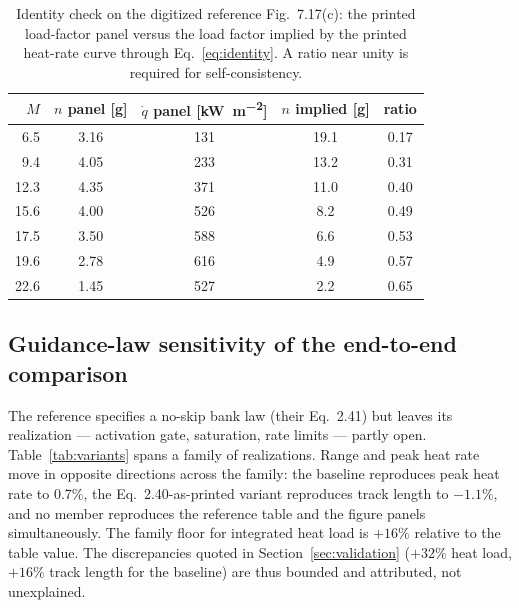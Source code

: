 \begin{table}[htbp]
\centering
\caption{Identity check on the digitized reference Fig.~7.17(c): the
  printed load-factor panel versus the load factor implied by the printed
  heat-rate curve through Eq.~\eqref{eq:identity}. A ratio near unity is
  required for self-consistency.}
\label{tab:identity}
\begin{tabular}{rcccc}
\toprule
$M$ & $n$ panel [g] & $\dot{q}$ panel [\si{\kilo\watt\per\square\metre}] &
$n$ implied [g] & ratio \\
\midrule
6.5   & 3.16 & 131 & 19.1 & 0.17 \\
9.4   & 4.05 & 233 & 13.2 & 0.31 \\
12.3  & 4.35 & 371 & 11.0 & 0.40 \\
15.6  & 4.00 & 526 & 8.2  & 0.49 \\
17.5  & 3.50 & 588 & 6.6  & 0.53 \\
19.6  & 2.78 & 616 & 4.9  & 0.57 \\
22.6  & 1.45 & 527 & 2.2  & 0.65 \\
\bottomrule
\end{tabular}
\end{table}

\subsection{Guidance-law sensitivity of the end-to-end comparison}
\label{app:variants}

The reference specifies a no-skip bank law (their Eq.~2.41) but leaves its
realization --- activation gate, saturation, rate limits --- partly open.
Table~\ref{tab:variants} spans a family of realizations. Range and peak
heat rate move in opposite directions across the family: the baseline
reproduces peak heat rate to 0.7\%, the Eq.~2.40-as-printed variant
reproduces track length to $-1.1\%$, and no member reproduces the
reference table and the figure panels simultaneously. The family floor for
integrated heat load is $+16\%$ relative to the table value. The
discrepancies quoted in Section~\ref{sec:validation} ($+32\%$ heat load,
$+16\%$ track length for the baseline) are thus bounded and attributed,
not unexplained.

